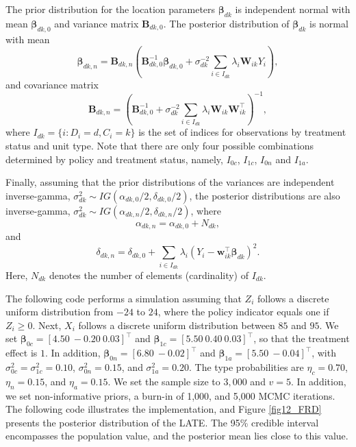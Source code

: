 The prior distribution for the location parameters $\boldsymbol{\beta}_{dk}$ is independent normal with mean $\boldsymbol{\beta}_{dk,0}$ and variance matrix $\mathbf{B}_{dk,0}$. The posterior distribution of $\boldsymbol{\beta}_{dk}$ is normal with mean
\[
\boldsymbol{\beta}_{dk,n} = \mathbf{B}_{dk,n} \left( \mathbf{B}_{dk,0}^{-1} \boldsymbol{\beta}_{dk,0} + \sigma_{dk}^{-2} \sum_{i \in I_{dk}} \lambda_i \mathbf{W}_{ik} Y_i \right),
\]
and covariance matrix
\[
\mathbf{B}_{dk,n} = \left( \mathbf{B}_{dk,0}^{-1} + \sigma_{dk}^{-2} \sum_{i \in I_{dk}} \lambda_i \mathbf{W}_{ik} \mathbf{W}_{ik}^{\top} \right)^{-1},
\]
where $I_{dk} = \{i : D_i = d, C_i = k\}$ is the set of indices for observations by treatment status and unit type. Note that there are only four possible combinations determined by policy and treatment status, namely, $I_{0c}$, $I_{1c}$, $I_{0n}$ and $I_{1a}$.

Finally, assuming that the prior distributions of the variances are independent inverse-gamma, $\sigma_{dk}^2 \sim IG(\alpha_{dk,0}/2, \delta_{dk,0}/2)$, the posterior distributions are also inverse-gamma, $\sigma_{dk}^2 \sim IG(\alpha_{dk,n}/2, \delta_{dk,n}/2)$, where
\[
\alpha_{dk,n} = \alpha_{dk,0} + N_{dk},
\]
and
\[
\delta_{dk,n} = \delta_{dk,0} + \sum_{i \in I_{dk}} \lambda_i \left(Y_i - \mathbf{w}_{ik}^{\top} \boldsymbol{\beta}_{dk} \right)^2.
\]
Here, $N_{dk}$ denotes the number of elements (cardinality) of $I_{dk}$.

The following code performs a simulation assuming that $Z_i$ follows a discrete uniform distribution from $-24$ to $24$, where the policy indicator equals one if $Z_i \geq 0$. Next, $X_i$ follows a discrete uniform distribution between $85$ and $95$. We set $\boldsymbol{\beta}_{0c} = [4.50 \ -0.20 \ 0.03]^{\top}$ and $\boldsymbol{\beta}_{1c} = [5.50 \ 0.40 \ 0.03]^{\top}$, so that the treatment effect is $1$. In addition, $\boldsymbol{\beta}_{0n} = [6.80 \ -0.02]^{\top}$ and $\boldsymbol{\beta}_{1a} = [5.50 \ -0.04]^{\top}$, with $\sigma_{0c}^2 = \sigma_{1c}^2 = 0.10$, $\sigma_{0n}^2 = 0.15$, and $\sigma_{1a}^2 = 0.20$. The type probabilities are $\eta_{c} = 0.70$, $\eta_{n} = 0.15$, and $\eta_{a} = 0.15$. We set the sample size to $3{,}000$ and $v = 5$. In addition, we set non-informative priors, a burn-in of 1,000, and 5,000 MCMC iterations. The following code illustrates the implementation, and Figure \ref{fig12_FRD} presents the posterior distribution of the LATE. The 95\% credible interval encompasses the population value, and the posterior mean lies close to this value.

